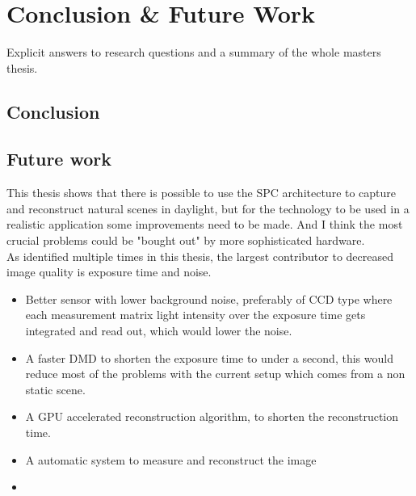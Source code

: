 \section{Conclusion \& Future Work}
Explicit answers to research questions and a summary of the whole masters thesis.

\subsection{Conclusion}

\subsection{Future work}
This thesis shows that there is possible to use the SPC architecture to capture and reconstruct natural scenes in daylight, but for the technology to be used in a realistic application some improvements need to be made. And I think the most crucial problems could be "bought out" by more sophisticated hardware.\\[0.1in]

As identified multiple times in this thesis, the largest contributor to decreased image quality is exposure time and noise. 

\begin{itemize}
\item Better sensor with lower background noise, preferably of CCD type where each measurement matrix light intensity over the exposure time gets integrated and read out, which would lower the noise.

\item A faster DMD to shorten the exposure time to under a second, this would reduce most of the problems with the current setup which comes from a non static scene.

\item A GPU accelerated reconstruction algorithm, to shorten the reconstruction time.

\item A automatic system to measure and reconstruct the image

\item 


\end{itemize}